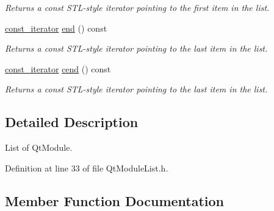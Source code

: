 \begin{DoxyCompactItemize}
\begin{DoxyCompactList}\small\item\em Returns a const S\+T\+L-\/style iterator pointing to the first item in the list. \end{DoxyCompactList}\item 
\hyperlink{class_mdt_1_1_deploy_utils_1_1_qt_module_list_ad6f5d3797918d10ffcce59cf37fcd86f}{const\+\_\+iterator} \hyperlink{class_mdt_1_1_deploy_utils_1_1_qt_module_list_ae6eb25e9f98e70ccd85a763d4ba188fd}{end} () const \hypertarget{class_mdt_1_1_deploy_utils_1_1_qt_module_list_ae6eb25e9f98e70ccd85a763d4ba188fd}{}\label{class_mdt_1_1_deploy_utils_1_1_qt_module_list_ae6eb25e9f98e70ccd85a763d4ba188fd}

\begin{DoxyCompactList}\small\item\em Returns a const S\+T\+L-\/style iterator pointing to the last item in the list. \end{DoxyCompactList}\item 
\hyperlink{class_mdt_1_1_deploy_utils_1_1_qt_module_list_ad6f5d3797918d10ffcce59cf37fcd86f}{const\+\_\+iterator} \hyperlink{class_mdt_1_1_deploy_utils_1_1_qt_module_list_ac6794cb4cc68f4218cd8b71c92f09479}{cend} () const \hypertarget{class_mdt_1_1_deploy_utils_1_1_qt_module_list_ac6794cb4cc68f4218cd8b71c92f09479}{}\label{class_mdt_1_1_deploy_utils_1_1_qt_module_list_ac6794cb4cc68f4218cd8b71c92f09479}

\begin{DoxyCompactList}\small\item\em Returns a const S\+T\+L-\/style iterator pointing to the last item in the list. \end{DoxyCompactList}\end{DoxyCompactItemize}


\subsection{Detailed Description}
List of Qt\+Module. 

Definition at line 33 of file Qt\+Module\+List.\+h.



\subsection{Member Function Documentation}
